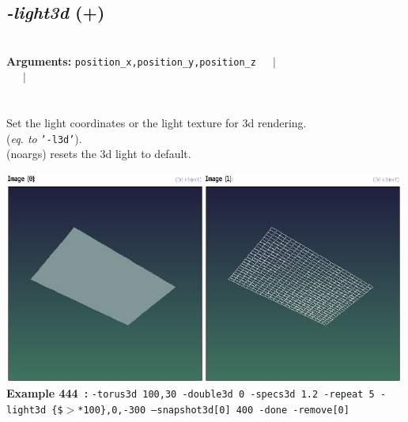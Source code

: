 \documentclass[a4paper,11pt,twoside]{book}
\begin{document}
\subsection{\emph{-light3d} (+)}\vspace*{-0.5em}
~\\\textbf{Arguments: } 
{\small \texttt{position\_x,position\_y,position\_z}}~~~$|$\\
\hspace*{2.2cm}{\small \texttt{[texture]}}~~~$|$\\
\\~\\
Set the light coordinates or the light texture for 3d rendering.
~\\(\emph{eq. to} {\small \texttt{'-l3d'}}).
~\\(noargs) resets the 3d light to default.
\begin{center}\includegraphics[keepaspectratio=true,height=7cm,width=\textwidth]{img/gmic_def444.jpg}\\
{\footnotesize \textbf{Example 444~:} \texttt{-torus3d 100,30 -double3d 0 -specs3d 1.2 -repeat 5 -light3d \{\$$>$*100\},0,-300 --snapshot3d[0] 400 -done -remove[0]}}
\end{center}
\end{document}
